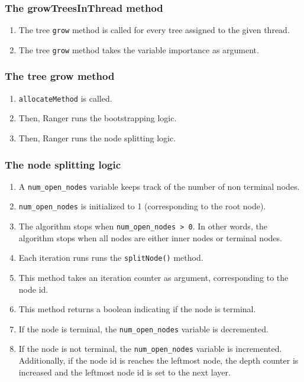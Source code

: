 \documentclass[12pt,oneside]{book}
\begin{document}
\subsubsection{The growTreesInThread method}

\begin{enumerate}
  \item The tree \lstinline|grow| method is called for every tree assigned to the given thread.
  \item The tree \lstinline|grow| method takes the variable importance as argument.
\end{enumerate}

\subsubsection{The tree grow method}

\begin{enumerate}
  \item \lstinline|allocateMethod| is called.
  \item Then, Ranger runs the bootstrapping logic.
  \item Then, Ranger runs the node splitting logic.
\end{enumerate}

\subsubsection{The node splitting logic}

\begin{enumerate}
  \item A \lstinline|num_open_nodes| variable keeps track of the number of non terminal nodes.
  \item \lstinline|num_open_nodes| is initialized to 1 (corresponding to the root node).
  \item The algorithm stops when \lstinline|num_open_nodes > 0|. In other words, the algorithm stops when all nodes are either inner nodes or terminal nodes.
  \item Each iteration runs runs the \lstinline|splitNode()| method.
  \item This method takes an iteration counter as argument, corresponding to the node id.
  \item This method returns a boolean indicating if the node is terminal.
  \item If the node is terminal, the \lstinline|num_open_nodes| variable is decremented.
  \item If the node is not terminal, the \lstinline|num_open_nodes| variable is incremented. Additionally, if the node id is reaches the leftmost node, the depth counter is increased and the leftmost node id is set to the next layer.
\end{enumerate}
\end{document}
